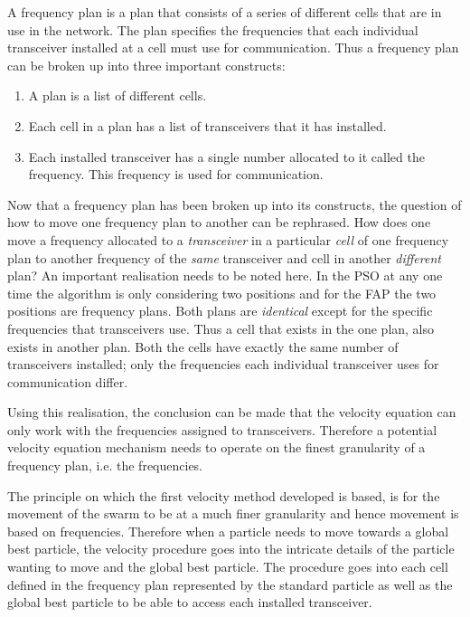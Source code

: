 A frequency plan is a plan that consists of a series of different cells that are in use in the network. The plan specifies the frequencies that each individual transceiver installed at a cell must use for communication. Thus a frequency plan can be broken up into three important constructs:
\begin{enumerate}
\item A plan is a list of different cells.
\item Each cell in a plan has a list of transceivers that it has installed.
\item Each installed transceiver has a single number allocated to it called the frequency. This frequency is used for communication.
\end{enumerate}

Now that a frequency plan has been broken up into its constructs, the question of how to move one frequency plan to another can be rephrased. How does one move a frequency allocated to a \emph{transceiver} in a particular \emph{cell} of one frequency plan to another frequency of the \emph{same} transceiver and cell in another \emph{different} plan? An important realisation needs to be noted here. In the \gls{PSO} at any one time the algorithm is only considering two positions and for the \gls{FAP} the two positions are frequency plans. Both plans are \emph{identical} except for the specific frequencies that transceivers use. Thus a cell that exists in the one plan, also exists in another plan. Both the cells have exactly the same number of transceivers installed; only the frequencies each individual transceiver uses for communication differ.

Using this realisation, the conclusion can be made that the velocity equation can only work with the frequencies assigned to transceivers. Therefore a potential velocity equation mechanism needs to operate on the finest granularity of a frequency plan, i.e. the frequencies.

The principle on which the first velocity method developed is based, is for the movement of the swarm to be at a much finer granularity and hence movement is based on frequencies. Therefore when a particle needs to move towards a global best particle, the velocity procedure goes into the intricate details of the particle wanting to move and the global best particle. The procedure goes into each cell defined in the frequency plan represented by the standard particle as well as the global best particle to be able to access each installed transceiver.

